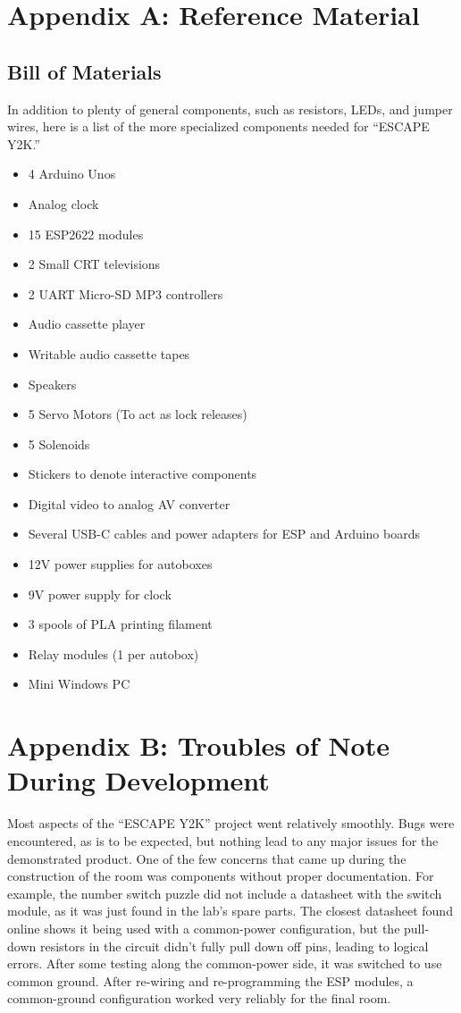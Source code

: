 \documentclass[conference]{IEEEtran}
\begin{document}
\section{Appendix A: Reference Material}

\subsection{Bill of Materials}
In addition to plenty of general components, such as resistors, LEDs, and jumper wires, here is a list of the more specialized 
components needed for ``ESCAPE Y2K.''

\begin{itemize}
    \item 4 Arduino Unos
    \item Analog clock
    \item 15 ESP2622 modules
    \item 2 Small CRT televisions
    \item 2 UART Micro-SD MP3 controllers
    \item Audio cassette player
    \item Writable audio cassette tapes
    \item Speakers
    \item 5 Servo Motors (To act as lock releases)
    \item 5 Solenoids
    \item Stickers to denote interactive components
    \item Digital video to analog AV converter
    \item Several USB-C cables and power adapters for ESP and Arduino boards
    \item 12V power supplies for autoboxes
    \item 9V power supply for clock
    \item 3 spools of PLA printing filament
    \item Relay modules (1 per autobox)
    \item Mini Windows PC
\end{itemize}

\section{Appendix B: Troubles of Note During Development}

\indent Most aspects of the ``ESCAPE Y2K'' project went relatively smoothly. Bugs were encountered, as is to be expected, 
but nothing lead to any major issues for the demonstrated product. One of the few concerns that came up during the 
construction of the room was components without proper documentation. For example, 
the number switch puzzle did not include a datasheet with the switch module, as it was just found in the lab's spare 
parts. The closest datasheet found online shows it being used with a common-power configuration, but the 
pull-down resistors in the circuit didn't fully pull down off pins, leading to logical errors. After some testing along 
the common-power side, it was switched to use common ground. After re-wiring and re-programming the ESP modules, 
a common-ground configuration worked very reliably for the final room.
\end{document}
